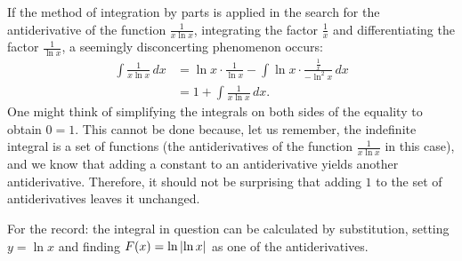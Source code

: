 \begin{remark}
If the method of integration by parts is applied in the search for the
antiderivative of the function $\frac{1}{x\ln x}$, integrating the factor $\frac
1 x$ and differentiating the factor $\frac 1 {\ln x}$, a seemingly disconcerting
phenomenon occurs:
\begin{align*}
  \int \frac{1}{x\ln x}\,dx
    &= \ln x \cdot \frac{1}{\ln x} - \int \ln x \cdot \frac{\frac 1 x}{-\ln^2
  x}\, dx\\
  &= 1 + \int \frac{1}{x\ln x}\, dx.
\end{align*}
One might think of simplifying the integrals on both sides of the equality to
obtain $0=1$. This cannot be done because, let us remember, the indefinite
integral is a set of functions (the antiderivatives of the function
$\frac{1}{x\ln x}$ in this case), and we know that adding a constant to an
antiderivative yields another antiderivative. Therefore, it should not be
surprising that adding $1$ to the set of antiderivatives leaves it unchanged.

For the record: the integral in question can be calculated by substitution,
setting $y=\ln x$ and finding $F(x) = \ln{\left|\ln x\right|}$ as one of the
antiderivatives.
\end{remark}